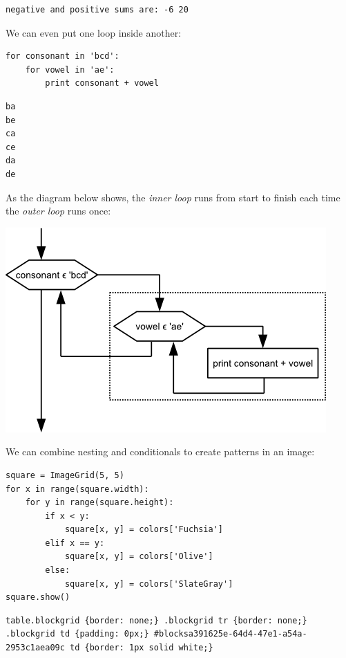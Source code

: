 \documentclass[]{book}
\newcommand{\gdef}[2]{\emph{#2}}
\begin{document}
\begin{verbatim}
negative and positive sums are: -6 20
\end{verbatim}

We can even put one loop inside another:

\begin{verbatim}
for consonant in 'bcd':
    for vowel in 'ae':
        print consonant + vowel
\end{verbatim}

\begin{verbatim}
ba
be
ca
ce
da
de
\end{verbatim}

As the diagram below shows, the \gdef{g:inner-loop}{inner loop} runs
from start to finish each time the \gdef{g:outer-loop}{outer loop}
runs once:

\includegraphics{novice/python/img/python-flowchart-nested-loops.png}

We can combine nesting and conditionals to create patterns in an image:

\begin{verbatim}
square = ImageGrid(5, 5)
for x in range(square.width):
    for y in range(square.height):
        if x < y:
            square[x, y] = colors['Fuchsia']
        elif x == y:
            square[x, y] = colors['Olive']
        else:
            square[x, y] = colors['SlateGray']
square.show()
\end{verbatim}

\begin{verbatim}
table.blockgrid {border: none;} .blockgrid tr {border: none;} .blockgrid td {padding: 0px;} #blocksa391625e-64d4-47e1-a54a-2953c1aea09c td {border: 1px solid white;}
\end{verbatim}
\end{document}
